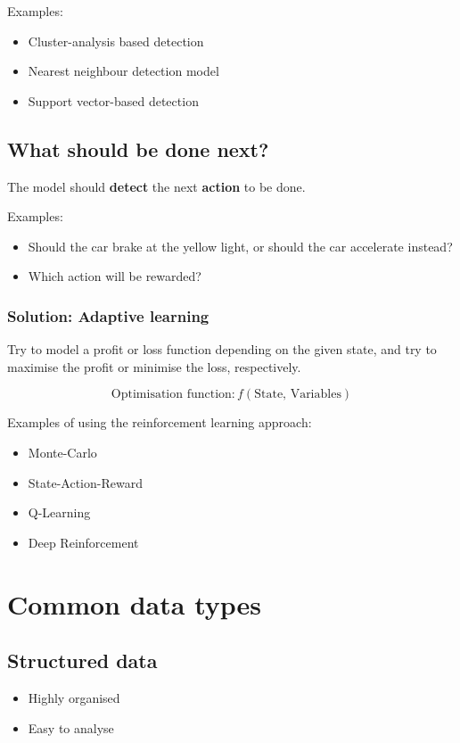 \documentclass[11pt]{article}
\begin{document}
Examples:
\begin{itemize}
\item Cluster-analysis based detection
\item Nearest neighbour detection model
\item Support vector-based detection
\end{itemize}
\subsection{What should be done next?}
\label{sec:org7fad579}
The model should \textbf{detect} the next \textbf{action} to be done.

Examples:
\begin{itemize}
\item Should the car brake at the yellow light, or should the car accelerate instead?
\item Which action will be rewarded?
\end{itemize}
\subsubsection{Solution: Adaptive learning}
\label{sec:orga79ef12}
Try to model a profit or loss function depending on the given state, and try to maximise the profit or minimise the loss, respectively.

\[\text{Optimisation function}: f(\text{State, Variables})\]

Examples of using the reinforcement learning approach:
\begin{itemize}
\item Monte-Carlo
\item State-Action-Reward
\item Q-Learning
\item Deep Reinforcement
\end{itemize}

 \newpage
\section{Common data types}
\label{sec:org6d5c150}

\subsection{Structured data}
\label{sec:orgebfc0e9}
\begin{itemize}
\item Highly organised
\item Easy to analyse
\end{itemize}
\end{document}
